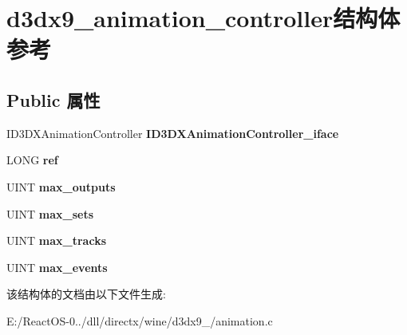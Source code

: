 \hypertarget{structd3dx9__animation__controller}{}\section{d3dx9\+\_\+animation\+\_\+controller结构体 参考}
\label{structd3dx9__animation__controller}
\subsection*{Public 属性}
\begin{DoxyCompactItemize}
\item 
\mbox{\label{structd3dx9__animation__controller_a4f502e7fe984c231c506479347d62fe6}} 
I\+D3\+D\+X\+Animation\+Controller {\bfseries I\+D3\+D\+X\+Animation\+Controller\+\_\+iface}
\item 
\mbox{\label{structd3dx9__animation__controller_a7ce77aac0c9debf82b7441783c890836}} 
L\+O\+NG {\bfseries ref}
\item 
\mbox{\label{structd3dx9__animation__controller_aa15a405e8a4c87b08bb8a92c56e451a5}} 
U\+I\+NT {\bfseries max\+\_\+outputs}
\item 
\mbox{\label{structd3dx9__animation__controller_a5972a5bc9e3f37bffee9e19587c0e132}} 
U\+I\+NT {\bfseries max\+\_\+sets}
\item 
\mbox{\label{structd3dx9__animation__controller_a5297c98740fb49d8bcb94ebbbbd2893a}} 
U\+I\+NT {\bfseries max\+\_\+tracks}
\item 
\mbox{\label{structd3dx9__animation__controller_ad4eff2c1efb2f13633c9b95e51840679}} 
U\+I\+NT {\bfseries max\+\_\+events}
\end{DoxyCompactItemize}


该结构体的文档由以下文件生成\+:\begin{DoxyCompactItemize}
\item 
E\+:/\+React\+O\+S-\/0../dll/directx/wine/d3dx9\+\_/animation.\+c\end{DoxyCompactItemize}
